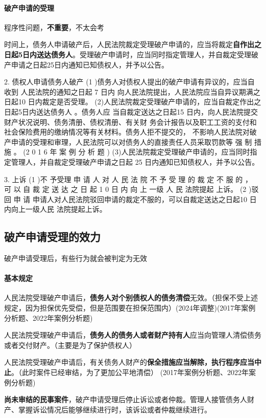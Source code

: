 \documentclass[UTF8,12pt]{ctexart}
\numberwithin{equation}{section} %
\numberwithin{figure}{section}
\numberwithin{table}{section}
\begin{document}
	\paragraph{破产申请的受理}
	程序性问题，\textbf{不重要}，不太会考
	
	时间上，债务人申请破产后，人民法院裁定受理破产申请的，应当将裁定\textbf{自作出之日起5日内送达债务人}。受理破产申请时，应当同时指定管理人，并自裁定受理破产申请之日起25日内通知已知债权人，并予以公告。
	
	2. 债权人申请债务人破产
	(1 )债务人对债权人提出的破产申请有异议的，应当自收到 人民法院的通知之日起 7 日内 向人民法院提出，人民法院应当自异议期满之日起10 日内裁定是否受理。 (2)人民法院裁定受理破产申请的，应当自裁定作出之日起5日内送达债务人 。债务人应 当自裁定送达之日起15 日内，向人民法院提交财产状况说明、债务清册、债权清册、有关财 务会计报告以及职工工资的支付和社会保险费用的缴纳情况等有关材料。债务人拒不提交的， 不影响人民法院对破产申请的受理和审理，人民法院可以对债务人的直接责任人员采取罚款等 强 制 措 施 。 (2 0 1 6 年 案 例 分 析 题 ) (3)人民法院裁定受理破产申请的，应当同时指定管理人，并自裁定受理破产申请之日起 25 日内通知已知债权人，并予以公告。
	
	3. 上诉
	(1 )不 予受理
	申 请 人 对 人 民 法 院 不 予 受 理 的 裁 定 不 服 的 ， 可 以 自 裁 定 送 达 之 日 起 1 0 日 内 向 上 一级 人 民 法院提起 上诉。
	(2 )驳 回 申 请
	申请人对人民法院驳回申请的裁定不服的，可以自裁定送达之日起10 日内向上一级人民 法院提起上诉。
	
	\subsection{破产申请受理的效力}
	破产申请受理后，有些行为就会被判定为无效
	
	\paragraph{基本规定}
	人民法院受理破产申请后，\textbf{债务人对个别债权人的债务清偿}无效。（担保不受上述规定，因为担保优先受偿，但是范围要在担保范围内）(2024年调整)(2017年案例分析题、2022年案例分析题)

	人民法院受理破产申请后，\textbf{债务人的债务人或者财产持有人}应当向管理人清偿债务或者交付财产。（主要是为了保护债权人）
	
	人民法院受理破产申请后，有关债务人财产的\textbf{保全措施应当解除，执行程序应当中止}。（此时案件已经审结，为了更加公平地清偿） (2017年案例分析题、2022年案例分析题)

	\textbf{尚未审结的民事案件}，破产申请受理后停止诉讼或者仲裁。管理人接管债务人财产、掌握诉讼情况后能够继续进行时，该诉讼或者仲裁继续进行。
	
\end{document}
